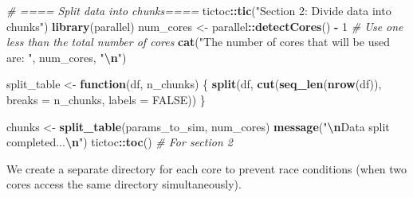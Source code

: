 \documentclass[
]{article}
\newenvironment{Shaded}{\begin{snugshade}}{\end{snugshade}}
\newcommand{\AttributeTok}[1]{\textcolor[rgb]{0.13,0.29,0.53}{#1}}
\newcommand{\CommentTok}[1]{\textcolor[rgb]{0.56,0.35,0.01}{\textit{#1}}}
\newcommand{\ConstantTok}[1]{\textcolor[rgb]{0.56,0.35,0.01}{#1}}
\newcommand{\ControlFlowTok}[1]{\textcolor[rgb]{0.13,0.29,0.53}{\textbf{#1}}}
\newcommand{\DecValTok}[1]{\textcolor[rgb]{0.00,0.00,0.81}{#1}}
\newcommand{\FunctionTok}[1]{\textcolor[rgb]{0.13,0.29,0.53}{\textbf{#1}}}
\newcommand{\NormalTok}[1]{#1}
\newcommand{\OtherTok}[1]{\textcolor[rgb]{0.56,0.35,0.01}{#1}}
\newcommand{\SpecialCharTok}[1]{\textcolor[rgb]{0.81,0.36,0.00}{\textbf{#1}}}
\newcommand{\StringTok}[1]{\textcolor[rgb]{0.31,0.60,0.02}{#1}}
\begin{document}
\begin{Shaded}
\begin{Highlighting}[]
\CommentTok{\# ==== Split data into chunks====}
\NormalTok{tictoc}\SpecialCharTok{::}\FunctionTok{tic}\NormalTok{(}\StringTok{"Section 2: Divide data into chunks"}\NormalTok{)}
\FunctionTok{library}\NormalTok{(parallel)}
\NormalTok{num\_cores }\OtherTok{\textless{}{-}}\NormalTok{ parallel}\SpecialCharTok{::}\FunctionTok{detectCores}\NormalTok{() }\SpecialCharTok{{-}} \DecValTok{1}  \CommentTok{\# Use one less than the total number of cores}
\FunctionTok{cat}\NormalTok{(}\StringTok{"The number of cores that will be used are: "}\NormalTok{, num\_cores, }\StringTok{"}\SpecialCharTok{\textbackslash{}n}\StringTok{"}\NormalTok{)}

\NormalTok{split\_table }\OtherTok{\textless{}{-}} \ControlFlowTok{function}\NormalTok{(df, n\_chunks) \{}
  \FunctionTok{split}\NormalTok{(df, }\FunctionTok{cut}\NormalTok{(}\FunctionTok{seq\_len}\NormalTok{(}\FunctionTok{nrow}\NormalTok{(df)), }\AttributeTok{breaks =}\NormalTok{ n\_chunks, }\AttributeTok{labels =} \ConstantTok{FALSE}\NormalTok{))}
\NormalTok{\}}

\NormalTok{chunks }\OtherTok{\textless{}{-}} \FunctionTok{split\_table}\NormalTok{(params\_to\_sim, num\_cores)}
\FunctionTok{message}\NormalTok{(}\StringTok{"}\SpecialCharTok{\textbackslash{}n}\StringTok{Data split completed...}\SpecialCharTok{\textbackslash{}n}\StringTok{"}\NormalTok{)}
\NormalTok{tictoc}\SpecialCharTok{::}\FunctionTok{toc}\NormalTok{() }\CommentTok{\# For section 2}
\end{Highlighting}
\end{Shaded}

We create a separate directory for each core to prevent race conditions
(when two cores access the same directory simultaneously).
\end{document}
